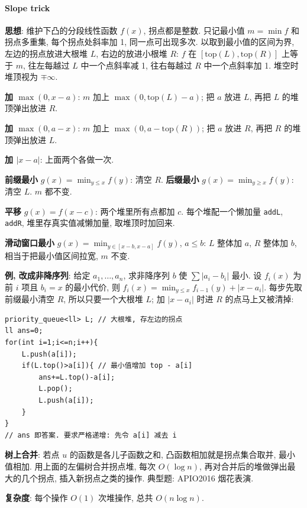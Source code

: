 \paragraph{Slope trick}
\begin{compactitem}
\item \textbf{思想}: 维护下凸的分段线性函数 $f(x)$, 拐点都是整数. 只记最小值 $m = \min f$ 和拐点多重集, 每个拐点处斜率加 1, 同一点可出现多次.
以取到最小值的区间为界, 左边的拐点放进大根堆 $L$, 右边的放进小根堆 $R$: $f$ 在 $[\mathrm{top}(L), \mathrm{top}(R)]$ 上等于 $m$, 往左每越过 $L$ 中一个点斜率减 1, 往右每越过 $R$ 中一个点斜率加 1. 堆空时堆顶视为 $\mp\infty$.
\item \textbf{加 $\max(0, x - a)$}: $m$ 加上 $\max(0, \mathrm{top}(L) - a)$; 把 $a$ 放进 $L$, 再把 $L$ 的堆顶弹出放进 $R$.
\item \textbf{加 $\max(0, a - x)$}: $m$ 加上 $\max(0, a - \mathrm{top}(R))$; 把 $a$ 放进 $R$, 再把 $R$ 的堆顶弹出放进 $L$.
\item \textbf{加 $|x - a|$}: 上面两个各做一次.
\item \textbf{前缀最小} $g(x) = \min_{y \le x} f(y)$: 清空 $R$. \textbf{后缀最小} $g(x) = \min_{y \ge x} f(y)$: 清空 $L$. $m$ 都不变.
\item \textbf{平移} $g(x) = f(x - c)$: 两个堆里所有点都加 $c$. 每个堆配一个懒加量 \texttt{addL}, \texttt{addR}, 堆里存真实值减懒加量, 取堆顶时加回来.
\item \textbf{滑动窗口最小} $g(x) = \min_{y \in [x - b, x - a]} f(y)$, $a \le b$: $L$ 整体加 $a$, $R$ 整体加 $b$, 相当于把最小值区间拉宽, $m$ 不变.
\item \textbf{例, 改成非降序列}: 给定 $a_1, \dots, a_n$, 求非降序列 $b$ 使 $\sum |a_i - b_i|$ 最小. 设 $f_i(x)$ 为前 $i$ 项且 $b_i = x$ 的最小代价, 则 $f_i(x) = \min_{y \le x} f_{i-1}(y) + |x - a_i|$.
每步先取前缀最小清空 $R$, 所以只要一个大根堆 $L$; 加 $|x - a_i|$ 时进 $R$ 的点马上又被清掉:
\begin{lstlisting}
priority_queue<ll> L; // 大根堆, 存左边的拐点
ll ans=0;
for(int i=1;i<=n;i++){
	L.push(a[i]);
	if(L.top()>a[i]){ // 最小值增加 top - a[i]
		ans+=L.top()-a[i];
		L.pop();
		L.push(a[i]);
	}
}
// ans 即答案. 要求严格递增: 先令 a[i] 减去 i
\end{lstlisting}
\item \textbf{树上合并}: 若点 $u$ 的函数是各儿子函数之和, 凸函数相加就是拐点集合取并, 最小值相加. 用上面的左偏树合并拐点堆, 每次 $O(\log n)$, 再对合并后的堆做弹出最大的几个拐点, 插入新拐点之类的操作. 典型题: APIO2016 烟花表演.
\item \textbf{复杂度}: 每个操作 $O(1)$ 次堆操作, 总共 $O(n \log n)$.
\end{compactitem}
